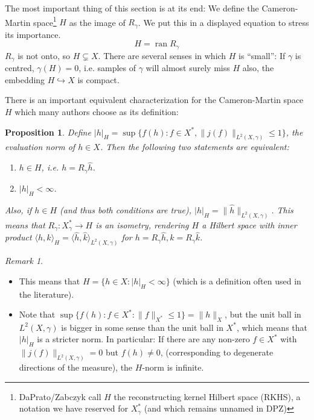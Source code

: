 \documentclass{scrartcl}
\newtheorem{prop}{Proposition}
\theoremstyle{definition}
\theoremstyle{remark}
\newtheorem{remark}{Remark}
\begin{document}
The most important thing of this section is at its end: We define the Cameron-Martin space\footnote{DaPrato/Zabczyk call $H$ the reconstructing kernel Hilbert space (RKHS), a notation we have reserved for $X_\gamma^*$ (and which remains unnamed in DPZ)} $H$ as the image of $R_\gamma$. We put this in a displayed equation to stress its importance.
\begin{displaymath}
H = \operatorname{ran} R_\gamma
\end{displaymath}
$R_\gamma$ is not onto, so $H\subsetneq X$. There are several senses in which $H$ is ``small'': If $\gamma$ is centred, $\gamma(H) = 0$, i.e. samples of $\gamma$ will almost surely miss $H$ also, the embedding $H\hookrightarrow X$ is compact.

There is an important equivalent characterization for the Cameron-Martin space $H$ which many authors choose as its definition:
\begin{prop}
Define $|h|_H = \sup\{f(h): f\in X^*, \|j(f)\|_{L^2(X, \gamma)} \leq 1\}$, the evaluation norm of $h\in X$. Then the following two statements are equivalent:
\begin{enumerate}
\item $h\in H$, i.e. $h = R_\gamma \hat h$.
\item $|h|_H < \infty$.
\end{enumerate}
Also, if $h\in H$ (and thus both conditions are true), $|h|_H = \|\hat h\|_{L^2(X,\gamma)}$. This means that $R_\gamma: X_\gamma^* \to H$ is an isometry, rendering $H$ a Hilbert space  with inner product $\langle h, k\rangle_H = \langle \hat h, \hat k\rangle_{L^2(X,\gamma)}$ for $h = R_\gamma \hat h, k = R_\gamma \hat k$.
\end{prop}
\begin{remark}
\begin{itemize}
\item  This means that $H = \{h\in X: |h|_H < \infty\}$ (which is a definition often used in the literature).
\item Note that $\sup\{f(h): f\in X^*: \|f\|_{X^*}\leq 1\} = \|h\|_X$, but the unit ball in $L^2(X,\gamma)$ is bigger in some sense than the unit ball in $X^*$, which means that $|h|_H$ is a stricter norm. In particular: If there are any non-zero $f\in X^*$ with $\|j(f)\|_{L^2(X,\gamma)} = 0$ but $f(h) \neq 0$, (corresponding to degenerate directions of the measure), the $H$-norm is infinite.
\end{itemize}
\end{remark}
\end{document}
